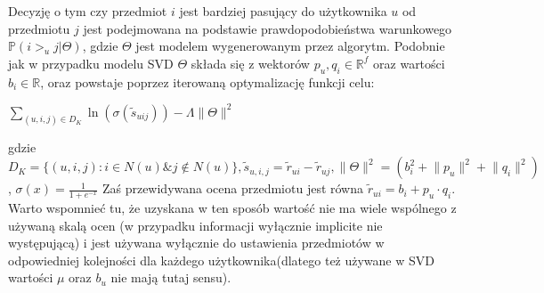 \documentclass{pracamgr}
\begin{document}
    Decyzję o tym czy przedmiot $i$ jest bardziej pasujący do użytkownika $u$ od przedmiotu $j$ jest podejmowana na podstawie prawdopodobieństwa warunkowego
    $\mathbb{P}(i>_u j|\Theta)$, gdzie $\Theta$ jest modelem wygenerowanym przez algorytm.
    Podobnie jak w przypadku modelu SVD $\Theta$ składa się z wektorów
    $p_u,q_i\in\mathbb{R}^f$ oraz wartości $b_i\in\mathbb{R}$, oraz powstaje poprzez iterowaną
    optymalizację funkcji celu:
    \begin{center}
     $\sum\limits_{(u,i,j)\in D_K}\ln{(\sigma(\tilde{s}_{uij}))}-\Lambda\lVert\Theta\rVert^2$
    \end{center}
    gdzie $D_K=\{(u,i,j):i\in N(u) \& j\notin N(u)\}, \tilde{s}_{u,i,j}=\tilde{r}_{ui}-\tilde{r}_{uj}, \lVert\Theta\rVert^2=(b_i^2+\lVert p_u\rVert^2+\lVert q_i\rVert^2)$,
    $\sigma(x)=\frac{1}{1+e^{-x}}$\newline
    Zaś przewidywana ocena przedmiotu jest równa $\tilde{r}_{ui}=b_i+p_u\cdot q_i$.\newline
    Warto wspomnieć tu, że uzyskana w ten sposób wartość nie ma wiele wspólnego z używaną skalą ocen 
    (w przypadku informacji wyłącznie implicite nie występującą) i jest używana wyłącznie do ustawienia przedmiotów w odpowiedniej kolejności
    dla każdego użytkownika(dlatego też używane w SVD wartości $\mu$ oraz $b_u$ nie mają tutaj sensu).\newline
    
\end{document}
